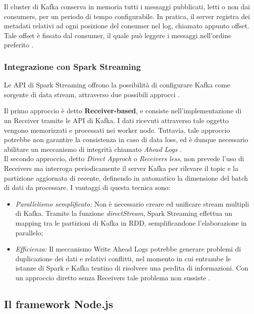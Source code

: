 \documentclass[11pt]{article}
\begin{document}
Il cluster di Kafka conserva in memoria tutti i messaggi pubblicati, letti o non dai consumers, per un periodo di tempo configurabile. In pratica, il server registra dei metadati relativi ad ogni posizione del consumer nel log, chiamato appunto offset. Tale offset è fissato dal consumer, il quale può leggere i messaggi nell'ordine preferito \cite{kafka}. 


\subsubsection{Integrazione con Spark Streaming}

Le API di Spark Streaming offrono la possibilità di configurare Kafka come sorgente di data stream, attraverso due possibili approcci \cite{spark}. 

Il primo approccio è detto \textbf{Receiver-based}, e consiste nell'implementazione di un Receiver tramite le API di Kafka. I dati ricevuti attraverso tale oggetto vengono memorizzati e processati nei worker node. Tuttavia, tale approccio potrebbe non garantire la consistenza in caso di data loss, ed è dunque necessario abilitare un meccanismo di integrità chiamato \textit{Ahead Logs} \cite{spark}. \\

Il secondo approccio, detto \textit{Direct Approch} o \textit{Receivers less}, non prevede l'uso di Receivers ma interroga periodicamente il server Kafka per rilevare il topic e la partizione aggiornata di recente, definendo in automatico la dimensione del batch di dati da processare. I vantaggi di questa tecnica sono: 
\begin{itemize}
	\item \textit{Parallelismo semplificato: } Non è necessario creare ed unificare stream multipli di Kafka. Tramite la funzione \textit{directStream}, Spark Streaming effettua un mapping tra le partizioni di Kafka in RDD, semplificandone l'elaborazione in parallelo;
	\item \textit{Efficienza: } Il meccanismo Write Ahead Logs potrebbe generare problemi di duplicazione dei dati e relativi conflitti, nel momento in cui entrambe le istanze di Spark e Kafka tentino di risolvere una perdita di informazioni. Con un approccio diretto senza Receivers tale problema non sussiste \cite{spark}.
\end{itemize}

\subsection{Il framework Node.js}
\end{document}
